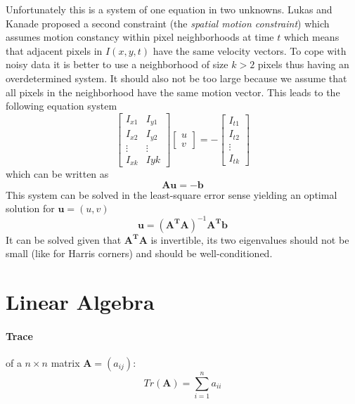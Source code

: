 \documentclass[a4paper,twocolumn]{article}
\begin{document}
Unfortunately this is a system of one equation in two unknowns. Lukas and Kanade
proposed a second constraint (the \textit{spatial motion constraint}) which
assumes motion constancy within pixel neighborhoods at time $t$ which means that
adjacent pixels in $I(x,y,t)$ have the same velocity vectors. To cope with noisy
data it is better to use a neighborhood of size $k > 2$ pixels thus having an
overdetermined system. It should also not be too large because we assume that
all pixels in the neighborhood have the same motion vector. This leads to the
following equation system
\begin{equation}
	\begin{bmatrix}
		I_{x1} & I_{y1} \\
		I_{x2} & I_{y2} \\
		\vdots & \vdots \\
		I_{xk} & I{yk}
	\end{bmatrix}
	\begin{bmatrix}
		u \\ v
	\end{bmatrix}
	= -\begin{bmatrix}
		I_{t1} \\ I_{t2} \\ \vdots \\ I_{tk}
	\end{bmatrix}
	\label{eq:optic-flow-lk}
\end{equation}
which can be written as
\begin{equation}
	\mathbf{A}\mathbf{u}=-\mathbf{b}
\end{equation}
This system can be solved in the least-square error sense yielding an optimal
solution for $\mathbf{u}=(u,v)$
\begin{equation}
	\mathbf{u}=(\mathbf{A^TA})^{-1}\mathbf{A^Tb}
\end{equation}
It can be solved given that $\mathbf{A^TA}$ is invertible, its two eigenvalues
should not be small (like for Harris corners) and should be well-conditioned.




\newpage

\appendix
\section{Linear Algebra}
\paragraph{Trace} of a $n \times n$ matrix $\mathbf{A} = (a_{ij})$:
\begin{equation}
	Tr(\mathbf{A}) = \sum_{i=1}^n a_{ii}
\end{equation}
\end{document}
